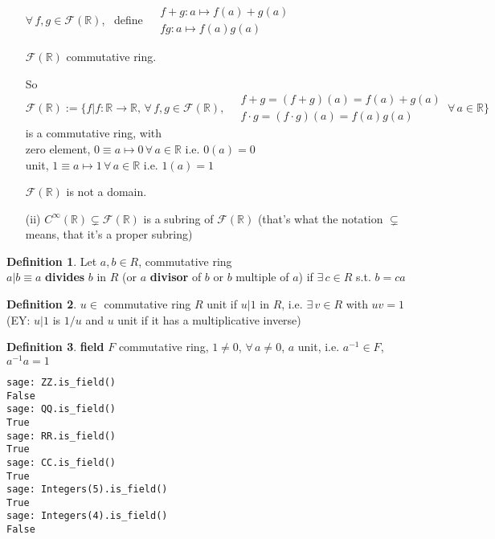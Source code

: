 \documentclass[twoside,landscape]{amsart}
\theoremstyle{plain}
\theoremstyle{definition}
\newtheorem{definition}{Definition}
\theoremstyle{remark}
\begin{document}
\begin{multicols*}{2}
\begin{enumerate}
$\forall\, f, g \in \mathcal{F}(\mathbb{R})$, \, define  $\begin{aligned}
  & f+ g : a \mapsto f(a) + g(a) \\ 
  & fg : a \mapsto f(a) g(a) \end{aligned}$ 

$\mathcal{F}(\mathbb{R})$ commutative ring.  

So
\[
\mathcal{F}(\mathbb{R}) := \lbrace f | f: \mathbb{R} \to \mathbb{R}, \, \forall \, f,g \in \mathcal{F}(\mathbb{R}), \, \begin{aligned} & f+g = (f+g)(a) = f(a)+g(a) \\
  & f\cdot g = (f\cdot g)(a) = f(a)g(a) \end{aligned} \, \forall \, a \in \mathbb{R} \rbrace
\]
is a commutative ring, with \\
zero element, $0 \equiv a \mapsto 0 \, \forall \, a \in \mathbb{R}$ i.e. $0(a)=0$ \\
unit, $1 \equiv a \mapsto 1 \, \forall \, a \in \mathbb{R}$ i.e. $1(a) = 1$

$\mathcal{F}(\mathbb{R})$ is not a domain.  

\item[(ii)] $C^{\infty}(\mathbb{R}) \subsetneq \mathcal{F}(\mathbb{R})$ is a subring of $\mathcal{F}(\mathbb{R})$ (that's what the notation $\subsetneq$ means, that it's a proper subring)
\end{enumerate}


\begin{definition}
Let $a,b \in R$, commutative ring \\
$a|b \equiv a $ \textbf{divides } $b$ in $R$ (or $a$ \textbf{divisor} of $b$ or $b$ multiple of $a$) if $\exists \, c \in R$ s.t. $b=ca$
\end{definition}


\begin{definition} $u \in $ commutative ring $R$ unit if $ u | 1 $ in $R$, i.e. $\exists \, v \in R$ with $uv =1$ (EY: $u|1$ is $1/u$ and $u$ unit if it has a multiplicative inverse)
\end{definition}

\begin{definition} \textbf{field} $F$ commutative ring, $1 \neq 0$, $\forall \, a \neq 0$, $a$ unit, i.e. $ a^{-1} \in F$, $a^{-1}a = 1$
\end{definition}

\begin{lstlisting}
sage: ZZ.is_field()
False
sage: QQ.is_field()
True
sage: RR.is_field()
True
sage: CC.is_field()
True
sage: Integers(5).is_field()
True
sage: Integers(4).is_field()
False
\end{lstlisting}



\end{multicols*}
\end{document}
